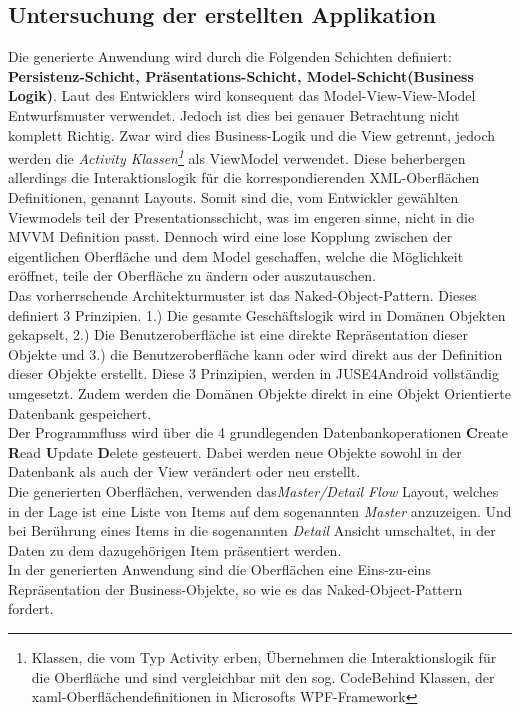 \documentclass[a4paper,twoside]{article}
\begin{document}
\subsection{Untersuchung der erstellten Applikation}
\label{untApp}
Die generierte Anwendung wird durch die Folgenden Schichten definiert: \textbf{Persistenz-Schicht, Präsentations-Schicht, Model-Schicht(Business Logik)}. Laut des Entwicklers wird konsequent das Model-View-View-Model Entwurfsmuster verwendet. Jedoch ist dies bei genauer Betrachtung nicht komplett Richtig. Zwar wird dies Business-Logik und die View getrennt, jedoch werden die \textit{Activity Klassen\footnote{Klassen, die vom Typ Activity erben, Übernehmen die Interaktionslogik für die Oberfläche und sind vergleichbar mit den sog. CodeBehind Klassen, der xaml-Oberflächendefinitionen in Microsofts WPF-Framework }} als ViewModel verwendet. Diese beherbergen allerdings die Interaktionslogik für die korrespondierenden XML-Oberflächen Definitionen, genannt Layouts. Somit sind die, vom Entwickler gewählten Viewmodels teil der Presentationsschicht, was im engeren sinne, nicht in die MVVM Definition passt.
Dennoch wird eine lose Kopplung zwischen der eigentlichen Oberfläche und dem Model geschaffen, welche die Möglichkeit eröffnet, teile der Oberfläche zu ändern oder auszutauschen.\\
Das vorherrschende Architekturmuster ist das Naked-Object-Pattern. Dieses definiert 3 Prinzipien. 1.) Die gesamte Geschäftslogik wird in Domänen Objekten gekapselt, 2.) Die Benutzeroberfläche ist eine direkte Repräsentation dieser Objekte und 3.) die Benutzeroberfläche kann oder wird direkt aus der Definition dieser Objekte erstellt. Diese 3 Prinzipien, werden in JUSE4Android vollständig umgesetzt. Zudem werden die Domänen Objekte direkt in eine Objekt Orientierte Datenbank gespeichert.\\
Der Programmfluss wird über die 4 grundlegenden Datenbankoperationen \textbf{C}reate \textbf{R}ead \textbf{U}pdate \textbf{D}elete gesteuert. Dabei werden neue Objekte sowohl in der Datenbank als auch der View verändert oder neu erstellt.\\ 
Die generierten Oberflächen, verwenden das\textit{Master/Detail Flow} Layout, welches in der Lage ist eine Liste von Items auf dem sogenannten \textit{Master} anzuzeigen. Und bei Berührung eines Items in die sogenannten \textit{Detail} Ansicht umschaltet, in der Daten zu dem dazugehörigen Item präsentiert werden.\\
In der generierten Anwendung sind die Oberflächen eine Eins-zu-eins Repräsentation der Business-Objekte, so wie es das Naked-Object-Pattern fordert.
\end{document}
